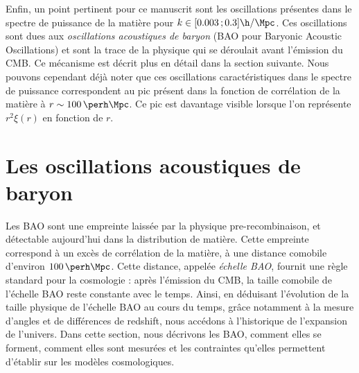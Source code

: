 \documentclass[11pt, twoside, a4paper, openright]{report}
\begin{document}
Enfin, un point pertinent pour ce manuscrit sont les oscillations présentes dans le spectre de puissance de la matière pour $k \in [\num{0.003} \,; \num{0.3}] \si{\h\per\Mpc}$. Ces oscillations sont dues aux \emph{oscillations acoustiques de baryon} (BAO pour Baryonic Acoustic Oscillations) et sont la trace de la physique qui se déroulait avant l'émission du CMB. Ce mécanisme est décrit plus en détail dans la section suivante. Nous pouvons cependant déjà noter que ces oscillations caractéristiques dans le spectre de puissance correspondent au pic présent dans la fonction de corrélation de la matière à $r \sim \SI{100}{\perh\Mpc}$. Ce pic est davantage visible lorsque l'on représente $r^2\xi(r)$ en fonction de $r$.

\section{Les oscillations acoustiques de baryon}
\label{sec:bao}
Les BAO sont une empreinte laissée par la physique pre-recombinaison, et détectable aujourd'hui dans la distribution de matière. Cette empreinte correspond à un excès de corrélation de la matière, à une distance comobile d'environ $\SI{100}{\perh\Mpc}$. Cette distance, appelée \emph{échelle BAO}, fournit une règle standard pour la cosmologie : après l'émission du CMB, la taille comobile de l'échelle BAO reste constante avec le temps.
Ainsi, en déduisant l'évolution de la taille physique de l'échelle BAO au cours du temps, grâce notamment à la mesure d'angles et de différences de redshift, nous accédons à l'historique de l'expansion de l'univers.
Dans cette section, nous décrivons les BAO, comment elles se forment, comment elles sont mesurées et les contraintes qu'elles permettent d'établir sur les modèles cosmologiques.
\end{document}
